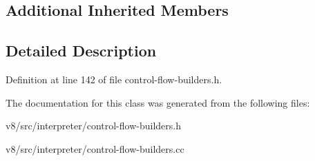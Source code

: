 \subsection*{Additional Inherited Members}


\subsection{Detailed Description}


Definition at line 142 of file control-\/flow-\/builders.\+h.



The documentation for this class was generated from the following files\+:\begin{DoxyCompactItemize}
\item 
v8/src/interpreter/control-\/flow-\/builders.\+h\item 
v8/src/interpreter/control-\/flow-\/builders.\+cc\end{DoxyCompactItemize}
